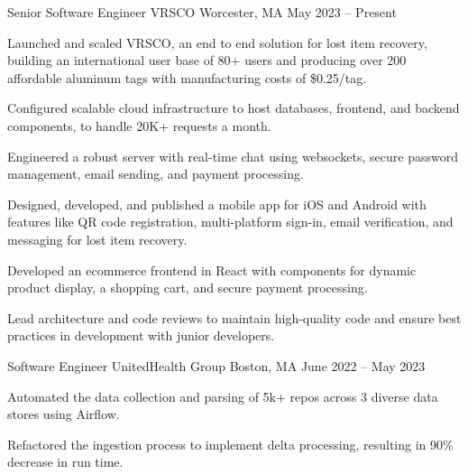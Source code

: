 

\begin{cventries}

  \cventry
    {Senior Software Engineer} %
    {VRSCO} %
    {Worcester, MA} %
    {May 2023 – Present}
    {
      \begin{cvitems} %
      \item {Launched and scaled VRSCO, an end to end solution for lost item recovery, building an international user base of 80+ users and producing over 200 affordable aluminum tags with manufacturing costs of \$0.25/tag.}
      \item {Configured scalable cloud infrastructure to host databases, frontend, and backend components, to handle 20K+ requests a month.}
      \item {Engineered a robust server with real-time chat using websockets, secure password management, email sending, and payment processing.}
      \item {Designed, developed, and published a mobile app for iOS and Android with features like QR code registration, multi-platform sign-in, email verification, and messaging for lost item recovery.}
      \item {Developed an ecommerce frontend in React with components for dynamic product display, a shopping cart, and secure payment processing.}
      \item {Lead architecture and code reviews to maintain high-quality code and ensure best practices in development with junior developers.}
      \end{cvitems}
    }
  \cventry
    {Software Engineer} %
    {UnitedHealth Group} %
    {Boston, MA} %
    {June 2022 – May 2023} %
    {
      \begin{cvitems} %
        \item {Automated the data collection and parsing of 5k+ repos across 3 diverse data stores using Airflow.}
        \item {Refactored the ingestion process to implement delta processing, resulting in 90\% decrease in run time.}

\end{cvitems}}
\end{cventries}
